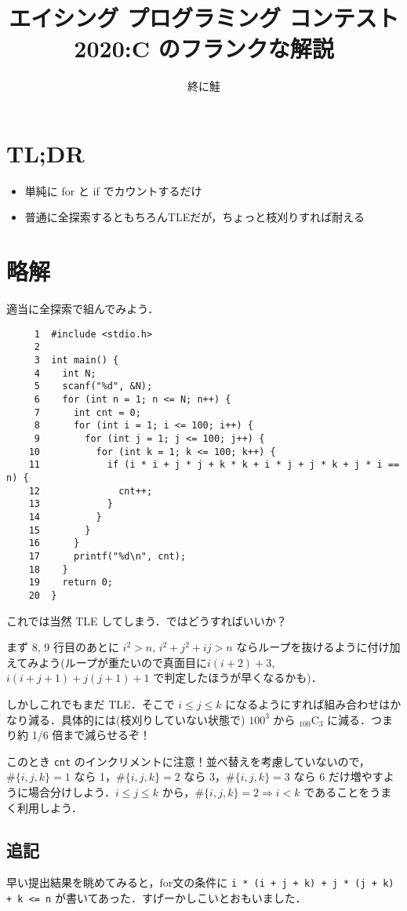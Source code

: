 \documentclass[11pt, dvipdfmx]{jarticle}
\title{エイシング プログラミング コンテスト 2020:C のフランクな解説}
\author{終に鮭}
\newcommand*{\set}[1]{\{#1\}}
\begin{document}
\maketitle

\section*{TL;DR}

\begin{itemize}
	\item 単純に for と if でカウントするだけ
	\item 普通に全探索するともちろんTLEだが，ちょっと枝刈りすれば耐える
\end{itemize}

\section*{略解}

適当に全探索で組んでみよう．
\begin{verbatim}
     1  #include <stdio.h>
     2
     3  int main() {
     4    int N;
     5    scanf("%d", &N);
     6    for (int n = 1; n <= N; n++) {
     7      int cnt = 0;
     8      for (int i = 1; i <= 100; i++) {
     9        for (int j = 1; j <= 100; j++) {
    10          for (int k = 1; k <= 100; k++) {
    11            if (i * i + j * j + k * k + i * j + j * k + j * i == n) {
    12              cnt++;
    13            }
    14          }
    15        }
    16      }
    17      printf("%d\n", cnt);
    18    }
    19    return 0;
    20  }
\end{verbatim}

これでは当然 TLE してしまう．ではどうすればいいか？

まず 8, 9 行目のあとに $i^2>n$, $i^2+j^2+ij>n$ ならループを抜けるように付け加えてみよう(ループが重たいので真面目に$i(i+2)+3$, $i(i+j+1)+j(j+1)+1$ で判定したほうが早くなるかも)．

しかしこれでもまだ TLE．そこで $i \leq j \leq k$ になるようにすれば組み合わせはかなり減る．具体的には(枝刈りしていない状態で) $100^3$ から ${}_{100}\mathrm{C}_{3}$ に減る．つまり約 1/6 倍まで減らせるぞ！

このとき \verb|cnt| のインクリメントに注意！並べ替えを考慮していないので，$\#\set{i,j,k}=1$ なら 1，$\#\set{i,j,k}=2$ なら 3，$\#\set{i,j,k}=3$ なら 6 だけ増やすように場合分けしよう．$i \leq j \leq k$ から，$\#\set{i,j,k}=2 \Longrightarrow i < k$ であることをうまく利用しよう．

\subsection*{追記}
早い提出結果を眺めてみると，for文の条件に \verb|i * (i + j + k) + j * (j + k) + k <= n| が書いてあった．すげーかしこいとおもいました．
\end{document}
